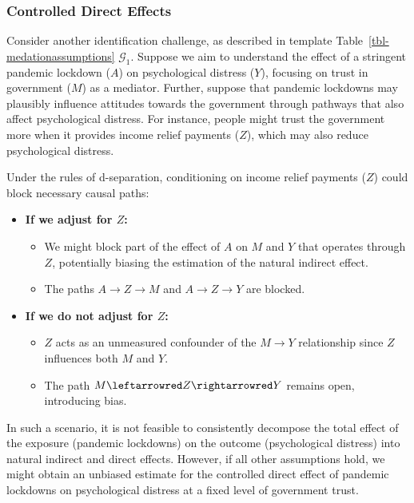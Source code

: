 \documentclass[
  single column]{article}
\providecommand{\tightlist}{%
  \setlength{\itemsep}{0pt}\setlength{\parskip}{0pt}}\usepackage{longtable,booktabs,array}
\begin{document}
\subsubsection{Controlled Direct
Effects}\label{controlled-direct-effects}

Consider another identification challenge, as described in template
Table~\ref{tbl-medationassumptions} \(\mathcal{G}_1\). Suppose we aim to
understand the effect of a stringent pandemic lockdown (\(A\)) on
psychological distress (\(Y\)), focusing on trust in government (\(M\))
as a mediator. Further, suppose that pandemic lockdowns may plausibly
influence attitudes towards the government through pathways that also
affect psychological distress. For instance, people might trust the
government more when it provides income relief payments (\(Z\)), which
may also reduce psychological distress.

Under the rules of d-separation, conditioning on income relief payments
(\(Z\)) could block necessary causal paths:

\begin{itemize}
\item
  \textbf{If we adjust for \(Z\):}

  \begin{itemize}
  \tightlist
  \item
    We might block part of the effect of \(A\) on \(M\) and \(Y\) that
    operates through \(Z\), potentially biasing the estimation of the
    natural indirect effect.
  \item
    The paths \(A \rightarrow Z \rightarrow M\) and
    \(A \rightarrow Z \rightarrow Y\) are blocked.
  \end{itemize}
\item
  \textbf{If we do not adjust for \(Z\):}

  \begin{itemize}
  \tightlist
  \item
    \(Z\) acts as an unmeasured confounder of the \(M \rightarrow Y\)
    relationship since \(Z\) influences both \(M\) and \(Y\).
  \item
    The path \(M \leftarrowred Z \rightarrowred Y\) remains open,
    introducing bias.
  \end{itemize}
\end{itemize}

In such a scenario, it is not feasible to consistently decompose the
total effect of the exposure (pandemic lockdowns) on the outcome
(psychological distress) into natural indirect and direct effects.
However, if all other assumptions hold, we might obtain an unbiased
estimate for the controlled direct effect of pandemic lockdowns on
psychological distress at a fixed level of government trust.
\end{document}

